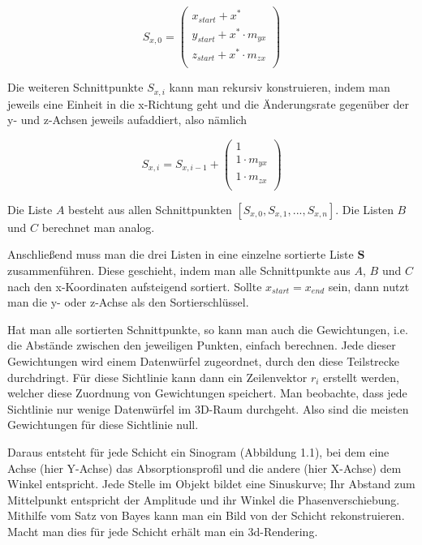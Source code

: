 \begin{equation}
  S_{x,0} = \begin{pmatrix}
    x_{start} + x^{\ast} \\
    y_{start} + x^{\ast} \cdot m_{yx} \\
    z_{start} + x^{\ast} \cdot m_{zx} \\
  \end{pmatrix}
\end{equation}

Die weiteren Schnittpunkte $S_{x,i}$ kann man rekursiv konstruieren, indem man jeweils eine Einheit in die x-Richtung geht und die Änderungsrate gegenüber der y- und z-Achsen jeweils aufaddiert, also nämlich

\begin{equation}
  S_{x,i} = S_{x,i-1} + \begin{pmatrix}
    1 \\
    1 \cdot m_{yx} \\
    1 \cdot m_{zx} \\
  \end{pmatrix}
\end{equation}

 Die Liste $A$ besteht aus allen Schnittpunkten $[S_{x,0}, S_{x,1}, ..., S_{x,n}]$. Die Listen $B$ und $C$ berechnet man analog.

Anschließend muss man die drei Listen in eine einzelne sortierte Liste $\mathbf{S}$ zusammenführen. Diese geschieht, indem man alle Schnittpunkte aus $A$, $B$ und $C$ nach den x-Koordinaten aufsteigend sortiert. Sollte $x_{start} = x_{end}$ sein, dann nutzt man die y- oder z-Achse als den Sortierschlüssel.

Hat man alle sortierten Schnittpunkte, so kann man auch die Gewichtungen, i.e. die Abstände zwischen den jeweiligen Punkten, einfach berechnen. Jede dieser Gewichtungen wird einem Datenwürfel zugeordnet, durch den diese Teilstrecke durchdringt. Für diese Sichtlinie kann dann ein Zeilenvektor $r_i$ erstellt werden, welcher diese Zuordnung von Gewichtungen speichert. Man beobachte, dass jede Sichtlinie nur wenige Datenwürfel im 3D-Raum durchgeht. Also sind die meisten Gewichtungen für diese Sichtlinie null.

Daraus entsteht für jede Schicht ein Sinogram (Abbildung 1.1), bei dem eine Achse (hier Y-Achse) das Absorptionsprofil und die andere (hier X-Achse) dem Winkel entspricht. Jede Stelle im Objekt bildet eine Sinuskurve; Ihr Abstand zum Mittelpunkt entspricht der Amplitude und ihr Winkel die Phasenverschiebung. Mithilfe vom Satz von Bayes kann man ein Bild von der Schicht rekonstruieren. Macht man dies für jede Schicht erhält man ein 3d-Rendering.


